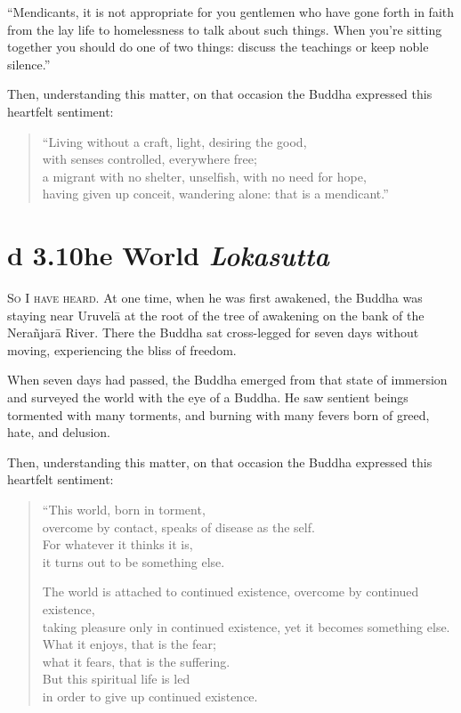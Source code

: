 \documentclass[12pt,openany]{book}%
\newcommand*{\suttatitleacronym}[1]{\smaller[2]{#1}\vspace*{.3em}}
\newcommand*{\suttatitletranslation}[1]{\linebreak{#1}}
\newcommand*{\suttatitleroot}[1]{\linebreak\smaller[2]\itshape{#1}}
\newcommand*{\tocacronym}[1]{\hspace*{-3.3em}{#1}\quad}
\newcommand*{\toctranslation}[1]{#1}
\newcommand*{\tocroot}[1]{(\textit{#1})}
\newcommand*{\scevam}[1]{\textsc{#1}}
\begin{document}
“Mendicants, it is not appropriate for you gentlemen who have gone forth in faith from the lay life to homelessness to talk about such things. When you’re sitting together you should do one of two things: discuss the teachings or keep noble silence.” 

Then, understanding this matter, on that occasion the Buddha expressed this heartfelt sentiment: 

\begin{verse}%
“Living without a craft, light, desiring the good, \\
with senses controlled, everywhere free; \\
a migrant with no shelter, unselfish, with no need for hope, \\
having given up conceit, wandering alone: that is a mendicant.” 

%
\end{verse}

%
\section*{{\suttatitleacronym Ud 3.10}{\suttatitletranslation The World }{\suttatitleroot Lokasutta}}
\addcontentsline{toc}{section}{\tocacronym{Ud 3.10} \toctranslation{The World } \tocroot{Lokasutta}}

\scevam{So I have heard. }At one time, when he was first awakened, the Buddha was staying near \textsanskrit{Uruvelā} at the root of the tree of awakening on the bank of the \textsanskrit{Nerañjarā} River. There the Buddha sat cross-legged for seven days without moving, experiencing the bliss of freedom. 

When seven days had passed, the Buddha emerged from that state of immersion and surveyed the world with the eye of a Buddha. He saw sentient beings tormented with many torments, and burning with many fevers born of greed, hate, and delusion. 

Then, understanding this matter, on that occasion the Buddha expressed this heartfelt sentiment: 

\begin{verse}%
“This world, born in torment, \\
overcome by contact, speaks of disease as the self. \\
For whatever it thinks it is, \\
it turns out to be something else. 

The world is attached to continued existence, overcome by continued existence, \\
taking pleasure only in continued existence, yet it becomes something else. \\
What it enjoys, that is the fear; \\
what it fears, that is the suffering. \\
But this spiritual life is led \\
in order to give up continued existence. 

%
\end{verse}
\end{document}
